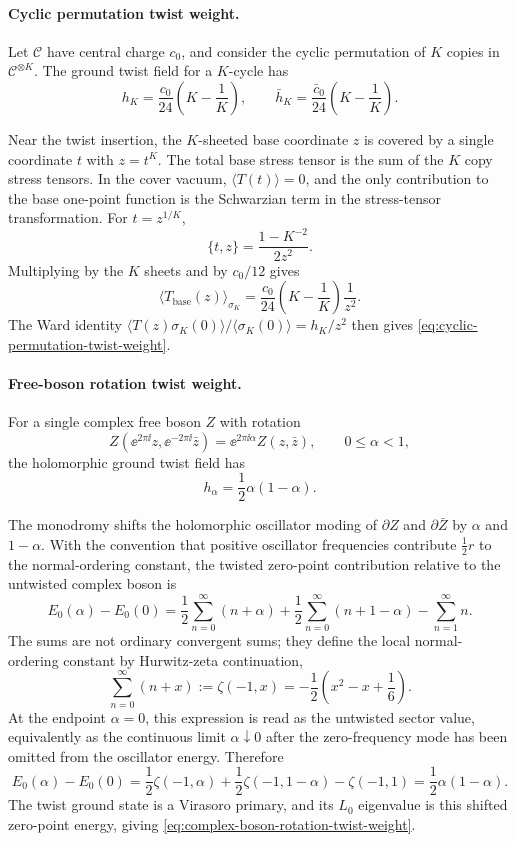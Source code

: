 \paragraph{Cyclic permutation twist weight.}
Let \(\mathcal C\) have central charge \(c_0\), and consider the cyclic
permutation of \(K\) copies in \(\mathcal C^{\otimes K}\).  The ground twist
field for a \(K\)-cycle has
\begin{equation}
  h_K=\frac{c_0}{24}\left(K-\frac1K\right),
  \qquad
  \bar h_K=\frac{\bar c_0}{24}\left(K-\frac1K\right).
  \label{eq:cyclic-permutation-twist-weight}
\end{equation}

Near the twist insertion, the \(K\)-sheeted base coordinate \(z\) is covered
by a single coordinate \(t\) with \(z=t^K\).  The total base stress tensor is
the sum of the \(K\) copy stress tensors.  In the cover vacuum,
\(\langle T(t)\rangle=0\), and the only contribution to the base one-point
function is the Schwarzian term in the stress-tensor transformation.  For
\(t=z^{1/K}\),
\[
  \{t,z\}=\frac{1-K^{-2}}{2z^2}.
\]
Multiplying by the \(K\) sheets and by \(c_0/12\) gives
\[
  \langle T_{\mathrm{base}}(z)\rangle_{\sigma_K}
  =
  \frac{c_0}{24}\left(K-\frac1K\right)\frac1{z^2}.
\]
The Ward identity
\(\langle T(z)\sigma_K(0)\rangle/\langle\sigma_K(0)\rangle=h_K/z^2\)
then gives \eqref{eq:cyclic-permutation-twist-weight}.

\paragraph{Free-boson rotation twist weight.}
For a single complex free boson \(Z\) with rotation
\[
  Z(\ee^{2\pi\ii}z,\ee^{-2\pi\ii}\bar z)
  =
  \ee^{2\pi\ii\alpha}Z(z,\bar z),
  \qquad 0\le\alpha<1,
\]
the holomorphic ground twist field has
\begin{equation}
  h_\alpha
  =
  \frac12\alpha(1-\alpha).
  \label{eq:complex-boson-rotation-twist-weight}
\end{equation}

The monodromy shifts the holomorphic oscillator moding of \(\partial Z\) and
\(\partial\bar Z\) by \(\alpha\) and \(1-\alpha\).  With the convention that
positive oscillator frequencies contribute \(\frac12 r\) to the
normal-ordering constant, the twisted zero-point contribution relative to the
untwisted complex boson is
\[
  E_0(\alpha)-E_0(0)
  =
  \frac12\sum_{n=0}^\infty(n+\alpha)
  +\frac12\sum_{n=0}^\infty(n+1-\alpha)
  -\sum_{n=1}^\infty n .
\]
The sums are not ordinary convergent sums; they define the local
normal-ordering constant by Hurwitz-zeta continuation,
\[
  \sum_{n=0}^\infty(n+x)
  :=
  \zeta(-1,x)
  =
  -\frac12\left(x^2-x+\frac16\right).
\]
At the endpoint \(\alpha=0\), this expression is read as the untwisted
sector value, equivalently as the continuous limit \(\alpha\downarrow0\)
after the zero-frequency mode has been omitted from the oscillator energy.
Therefore
\[
  E_0(\alpha)-E_0(0)
  =
  \frac12\zeta(-1,\alpha)
  +\frac12\zeta(-1,1-\alpha)
  -\zeta(-1,1)
  =
  \frac12\alpha(1-\alpha).
\]
The twist ground state is a Virasoro primary, and its \(L_0\) eigenvalue is
this shifted zero-point energy, giving
\eqref{eq:complex-boson-rotation-twist-weight}.


